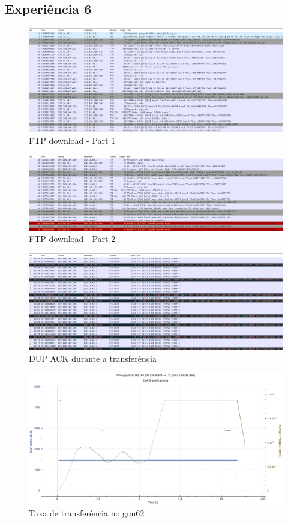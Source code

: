 \documentclass[article, a4paper, 11pt, oneside]{memoir}
\begin{document}
\subsection{Experiência 6}
\begin{figure}[h]
	\centering
\includegraphics[scale=0.55]{exp6-step3-part1.png}
\caption{FTP download - Part 1}
\end{figure}

\begin{figure}[h]
	\centering
\includegraphics[scale=0.55]{exp6-step3-part2.png}
\caption{FTP download - Part 2}
\end{figure}

\newpage
\begin{figure}[h]
	\centering
\includegraphics[scale=0.55]{exp6-step5-error.png}
\caption{DUP ACK durante a transferência}
\end{figure}

\begin{figure}[h]
	\centering
\includegraphics[scale=0.55]{exp6-step5-gnu62-graph.png}
\caption{Taxa de transferência no gnu62}
\end{figure}
\end{document}

